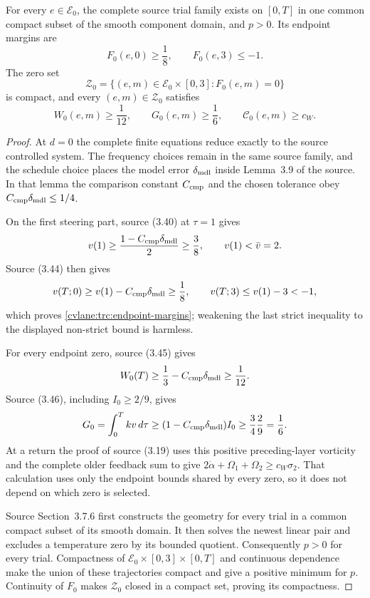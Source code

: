 \begin{cvlanlemma}\label{cvlane:trc:source-margins}
For every $e\in\mathcal E_0$, the complete source trial family exists on
$[0,T]$ in one common compact subset of the smooth component domain, and
$p>0$.  Its endpoint margins are
\begin{equation}\label{cvlane:trc:endpoint-margins}
 F_0(e,0)\geq\frac18,
 \qquad F_0(e,3)\leq-1.
\end{equation}
The zero set
\[
 \mathcal Z_0=\{(e,m)\in\mathcal E_0\times[0,3]:F_0(e,m)=0\}
\]
is compact, and every $(e,m)\in\mathcal Z_0$ satisfies
\begin{equation}\label{cvlane:trc:root-margins}
 W_0(e,m)\geq\frac1{12},\qquad
 G_0(e,m)\geq\frac16,
 \qquad \mathcal C_0(e,m)\geq c_W.
\end{equation}
\end{cvlanlemma}

\begin{proof}
At $d=0$ the complete finite equations reduce exactly to the source
controlled system.  The frequency choices remain in the same source
family, and the schedule choice places the model error
$\delta_{\rm mdl}$ inside Lemma~3.9 of the source.  In that lemma the
comparison constant $C_{\rm cmp}$ and the chosen tolerance obey
$C_{\rm cmp}\delta_{\rm mdl}\leq1/4$.

On the first steering part, source (3.40) at $\tau=1$ gives
\[
 v(1)\geq\frac{1-C_{\rm cmp}\delta_{\rm mdl}}2\geq\frac38,
 \qquad v(1)<\bar v=2.
\]
Source (3.44) then gives
\[
 v(T;0)\geq v(1)-C_{\rm cmp}\delta_{\rm mdl}\geq\frac18,
 \qquad
 v(T;3)\leq v(1)-3<-1,
\]
which proves \eqref{cvlane:trc:endpoint-margins}; weakening the last strict
inequality to the displayed non-strict bound is harmless.

For every endpoint zero, source (3.45) gives
\[
 W_0(T)\geq\frac13-C_{\rm cmp}\delta_{\rm mdl}\geq\frac1{12}.
\]
Source (3.46), including $I_0\geq2/9$, gives
\[
 G_0=\int_0^Tkv\,d\tau
 \geq(1-C_{\rm cmp}\delta_{\rm mdl})I_0
 \geq\frac34\frac29=\frac16.
\]
At a return the proof of source (3.19) uses this positive preceding-layer
vorticity and the complete older feedback sum to give
$2\dot\alpha+\Omega_1+\Omega_2\geq c_W\sigma_2$.
That calculation uses only the endpoint bounds shared by every zero, so it
does not depend on which zero is selected.

Source Section~3.7.6 first constructs the geometry for every trial in a
common compact subset of its smooth domain.  It then solves the newest
linear pair and excludes a temperature zero by its bounded quotient.
Consequently $p>0$ for every trial.  Compactness of
$\mathcal E_0\times[0,3]\times[0,T]$ and continuous dependence make the
union of these trajectories compact and give a positive minimum for $p$.
Continuity of $F_0$ makes $\mathcal Z_0$ closed in a compact set, proving
its compactness.
\end{proof}

